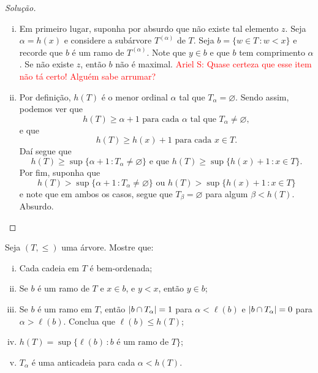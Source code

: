 \documentclass[a4paper]{article}
\begin{document}
\begin{proof}[Solução]
\begin{enumerate}[(i)]
  \item Em primeiro lugar, suponha por absurdo que não existe tal elemento
    \(z\). Seja \(\alpha=h(x)\) e considere a subárvore \(T^{(\alpha)}\) de \(T\).
    Seja \(b=\{w \in T \,\colon w<x\}\) e recorde que \(b\) é um ramo de
    \(T^{(\alpha)}\). Note que \(y\in b\) e que \(b\) tem comprimento \(\alpha\). Se
    não existe \(z\), então \(b\) não é maximal. \textcolor{red}{Ariel S: Quase
      certeza que esse item não tá certo! Alguém sabe arrumar?}

  \item  Por definição, \(h(T)\) é o menor ordinal
    \(\alpha\) tal que \(T_\alpha=\varnothing\). Sendo assim, podemos ver que
    \[h(T)\geq \alpha +1 \text{ para cada } \alpha \text{ tal que }
      T_\alpha\not=\varnothing,\]
    e que
    \[h(T)\geq h(x)+1\text{ para cada } x\in T.\]
    Daí segue que
    \[h(T)\geq \sup\{\alpha+1\,\colon T_\alpha\not=\varnothing\}\text{ e que }
      h(T)\geq\sup\{h(x)+1\,\colon x\in T\}.\]
    Por fim, suponha que
    \[h(T)> \sup\{\alpha+1\,\colon T_\alpha\not=\varnothing\}\text{ ou } h(T)
      >\sup\{h(x)+1\,\colon x\in T\}\]
    e note que em ambos os casos, segue que \(T_\beta=\varnothing\) para algum \(\beta<
    h(T)\). Absurdo.\qedhere
\end{enumerate}
\end{proof}
\begin{exercicio}
    Seja \((T,\leq)\) uma árvore. Mostre que:
    \begin{enumerate}[(i)]
    \item Cada cadeia em \(T\) é bem-ordenada;
    \item Se \(b\) é um ramo de \(T\) e \(x\in b\), e \(y<x\), então \(y\in b\);
    \item Se \(b\) é um ramo em \(T\), então \(\vert b\cap T_\alpha \vert=1\) para
      \(\alpha <\ell (b)\) e \(\vert b\cap T_\alpha \vert=0\) para \(\alpha
      >\ell (b)\). Conclua que \(\ell (b)\leq h(T)\);
    \item \(h(T)=\sup\{\ell (b)\,\colon b \text{ é um ramo de } T\}\);
    \item \(T_\alpha\) é uma anticadeia para cada \(\alpha < h(T)\).
     \end{enumerate}
  \end{exercicio}
\end{document}

